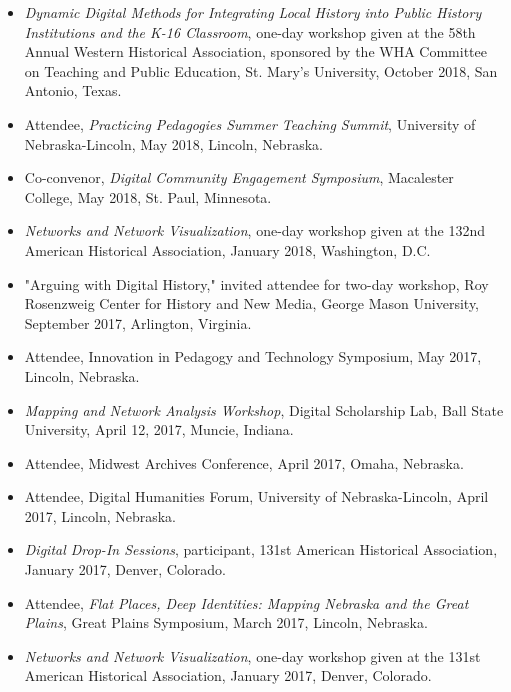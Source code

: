 \documentclass[10pt]{article}
\begin{document}
\begin{itemize}
  \item \textit{Dynamic Digital Methods for Integrating Local History into Public History Institutions and the K-16 Classroom}, one-day workshop given at the 58th Annual Western Historical Association, sponsored by the WHA Committee on Teaching and Public Education, St. Mary's University, October 2018, San Antonio, Texas.
  
  \item Attendee, \textit{Practicing Pedagogies Summer Teaching Summit}, University of Nebraska-Lincoln, May 2018, Lincoln, Nebraska.
  
  \item Co-convenor, \textit{Digital Community Engagement Symposium}, Macalester College, May 2018, St. Paul, Minnesota.
  
  \item \textit{Networks and Network Visualization}, one-day workshop given at the 132nd American Historical Association, January 2018, Washington, D.C.
  
  \item "Arguing with Digital History," invited attendee for two-day workshop, Roy Rosenzweig Center for History and New Media, George Mason University, September 2017, Arlington, Virginia.
  
  \item Attendee, Innovation in Pedagogy and Technology Symposium, May 2017, Lincoln, Nebraska.
  
  \item \textit{Mapping and Network Analysis Workshop}, Digital Scholarship Lab, Ball State University, April 12, 2017, Muncie, Indiana.
  
  \item Attendee, Midwest Archives Conference, April 2017, Omaha, Nebraska.
  
  \item Attendee, Digital Humanities Forum, University of Nebraska-Lincoln, April 2017, Lincoln, Nebraska.
  
  \item \textit{Digital Drop-In Sessions}, participant, 131st American Historical Association, January 2017, Denver, Colorado.
  
  \item Attendee, \textit{Flat Places, Deep Identities: Mapping Nebraska and the Great Plains}, Great Plains Symposium, March 2017, Lincoln, Nebraska.
  
  \item \textit{Networks and Network Visualization}, one-day workshop given at the 131st American Historical Association, January 2017, Denver, Colorado.
  

\end{itemize}
\end{document}
